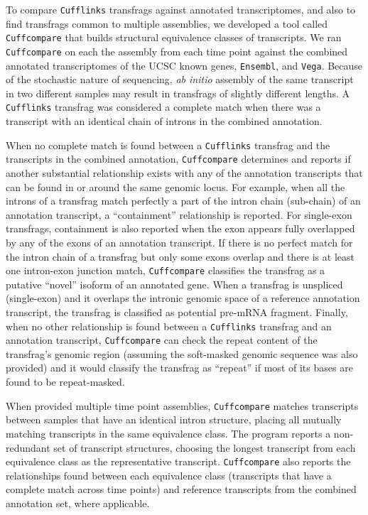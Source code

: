 \documentclass[12pt]{amsart}
\theoremstyle{definition}
\begin{document}
To compare {\tt Cufflinks} transfrags against annotated transcriptomes, and
also to find transfrags common to multiple assemblies, we developed a tool
called {\tt Cuffcompare} that builds structural equivalence classes of
transcripts. We ran {\tt Cuffcompare} on each the assembly from each time point against the
combined annotated transcriptomes of the {UCSC known genes}, {\tt Ensembl},
and {\tt Vega}. Because of the stochastic nature of sequencing, \emph{ab
initio} assembly of the same transcript in two different samples may result in
transfrags of slightly different lengths. A {\tt Cufflinks} transfrag was
considered a complete match when there was a transcript with an identical
chain of introns in the combined annotation.

When no complete match is found between a {\tt Cufflinks} transfrag and the
transcripts in the combined annotation, {\tt Cuffcompare} determines and reports if
another substantial relationship exists with any of the annotation
transcripts that can be found in or around the same genomic locus. For
example, when all the introns of a transfrag match perfectly a part of the
intron chain (sub-chain) of an annotation transcript, a ``containment''
relationship is reported. For single-exon transfrags, containment is also
reported when the exon appears fully overlapped by any of the exons of an
annotation transcript. If there is no perfect match for the intron chain of a
transfrag but only some exons overlap and there is at least one intron-exon
junction match, {\tt Cuffcompare} classifies the transfrag as a putative ``novel''
isoform of an annotated gene. When a transfrag is unspliced (single-exon) and
it overlaps the intronic genomic space of a reference annotation transcript,
the transfrag is classified as potential pre-mRNA fragment. Finally, when no
other relationship is found between a {\tt Cufflinks} transfrag and an
annotation transcript, {\tt Cuffcompare} can check the repeat content of the
transfrag's genomic region (assuming the soft-masked genomic sequence was also
provided) and it would classify the transfrag as ``repeat'' if most of its
bases are found to be repeat-masked.

When provided multiple time point assemblies, {\tt Cuffcompare} matches transcripts
between samples that have an identical intron structure, placing all mutually
matching transcripts in the same equivalence class. The program reports a
non-redundant set of transcript structures, choosing the longest transcript
from each equivalence class as the representative transcript. {\tt Cuffcompare} also
reports the relationships found between each equivalence class (transcripts
that have a complete match across time points) and reference transcripts from
the combined annotation set, where applicable.
\end{document}
